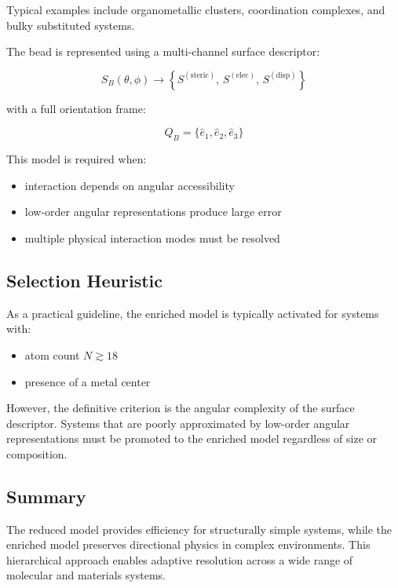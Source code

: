 \documentclass[11pt]{article}
\begin{document}
Typical examples include organometallic clusters, coordination complexes, and bulky substituted systems.

The bead is represented using a multi-channel surface descriptor:

\begin{equation}
S_B(\theta,\phi) \rightarrow
\left\{
S^{(\text{steric})},\,
S^{(\text{elec})},\,
S^{(\text{disp})}
\right\}
\end{equation}

with a full orientation frame:

\begin{equation}
Q_B = \{\hat{e}_1, \hat{e}_2, \hat{e}_3\}
\end{equation}

This model is required when:
\begin{itemize}
    \item interaction depends on angular accessibility
    \item low-order angular representations produce large error
    \item multiple physical interaction modes must be resolved
\end{itemize}

\subsection{Selection Heuristic}

As a practical guideline, the enriched model is typically activated for systems with:
\begin{itemize}
    \item atom count $N \gtrsim 18$
    \item presence of a metal center
\end{itemize}

However, the definitive criterion is the angular complexity of the surface descriptor. Systems that are poorly approximated by low-order angular representations must be promoted to the enriched model regardless of size or composition.

\subsection{Summary}

The reduced model provides efficiency for structurally simple systems, while the enriched model preserves directional physics in complex environments. This hierarchical approach enables adaptive resolution across a wide range of molecular and materials systems.
\end{document}
